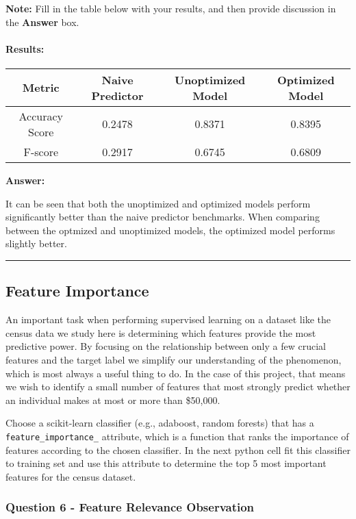\documentclass[11pt]{article}
\begin{document}
\textbf{Note:} Fill in the table below with your results, and then
provide discussion in the \textbf{Answer} box.

    \paragraph{Results:}\label{results}

\begin{longtable}[]{@{}cccc@{}}
\toprule
Metric & Naive Predictor & Unoptimized Model & Optimized
Model\tabularnewline
\midrule
\endhead
Accuracy Score & 0.2478 & 0.8371 & 0.8395\tabularnewline
F-score & 0.2917 & 0.6745 & 0.6809\tabularnewline
\bottomrule
\end{longtable}

    \textbf{Answer: }

It can be seen that both the unoptimized and optimized models perform
significantly better than the naive predictor benchmarks. When comparing
between the optmized and unoptimized models, the optimized model
performs slightly better.

    \begin{center}\rule{0.5\linewidth}{\linethickness}\end{center}

\subsection{Feature Importance}\label{feature-importance}

An important task when performing supervised learning on a dataset like
the census data we study here is determining which features provide the
most predictive power. By focusing on the relationship between only a
few crucial features and the target label we simplify our understanding
of the phenomenon, which is most always a useful thing to do. In the
case of this project, that means we wish to identify a small number of
features that most strongly predict whether an individual makes at most
or more than \$50,000.

Choose a scikit-learn classifier (e.g., adaboost, random forests) that
has a \texttt{feature\_importance\_} attribute, which is a function that
ranks the importance of features according to the chosen classifier. In
the next python cell fit this classifier to training set and use this
attribute to determine the top 5 most important features for the census
dataset.

    \subsubsection{Question 6 - Feature Relevance
Observation}\label{question-6---feature-relevance-observation}
\end{document}
